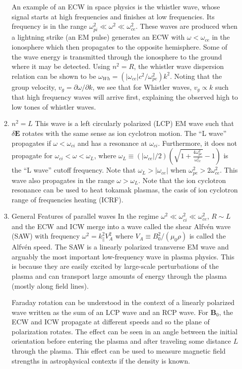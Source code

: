 \begin{itemize}
\begin{enumerate}
			\par An example of an ECW in space physics is the whistler wave, whose signal starts at high frequencies and finishes at low frequencies. Its frequency is in the range $\omega_{pi}^2\ll\omega^2\ll\omega_{ce}^2$. These waves are produced when a lightning strike (an EM pulse) generates an ECW with $\omega<\omega_{ce}$ in the ionosphere which then propagates to the opposite hemisphere. Some of the wave energy is transmitted through the ionosphere to the ground where it may be detected. Using $n^2=R$, the whistler wave dispersion relation can be shown to be $\omega_{Wh}=(|\omega_{ce}|c^2/\omega_{pe}^2)k^2$. Noting that the group velocity, $v_g=\partial\omega/\partial k$, we see that for Whistler waves, $v_g\propto k$ such that high frequency waves will arrive first, explaining the observed high to low tones of whistler waves.

			\item{$n^2=L$}
			This wave is a left circularly polarized (LCP) EM wave such that $\delta\mathbf{E}$ rotates with the same sense as ion cyclotron motion. The ``L wave'' propagates if $\omega<\omega_{ci}$ and has a resonance at $\omega_{ci}$. Furthermore, it does not propagate for $\omega_{ci}<\omega<\omega_L$, where $\omega_L\equiv(|\omega_{ce}|/2)(\sqrt{1+\frac{4\omega_{pe}^2}{\omega_{ce}^2}} - 1)$ is the ``L wave'' cutoff frequency. Note that $\omega_L>|\omega_{ce}|$ when $\omega_{pe}^2>2\omega_{ce}^2$. This wave also propagates in the range $\omega>\omega_L$. Note that the ion cyclotron resonance can be used to heat tokamak plasmas, the casis of ion cyclotron range of frequencies heating (ICRF).

			\item{General Features of parallel waves}
			In the regime $\omega^2\ll\omega_{ci}^2\ll\omega_{ce}^2$, $R\sim L$ and the ECW and ICW merge into a wave called the shear Alfv\'{e}n wave (SAW) with frequency $\omega^2=k_{\parallel}^2V_A^2$ where $V_A\equiv B_0^2/(\mu_0\rho)$ is called the Alfv\'{e}n speed. The SAW is a linearly polarized transverse EM wave  and arguably the most important low-frequency wave in plasma physics. This is because they are easily excited by large-scale perturbations of the plasma and can transport large amounts of energy through the plasma (mostly along field lines).

			Faraday rotation can be understood in the context of a linearly polarized wave written as the sum of an LCP wave and an RCP wave. For $\mathbf{B}_0$, the ECW and ICW propagate at different speeds and so the plane of polarization rotates. The effect can be seen in an angle between the initial orientation before entering the plasma and after traveling some distance $L$ through the plasma. This effect can be used to measure magnetic field strengths in astrophysical contexts if the density is known. 
		\end{enumerate}


\end{itemize}
